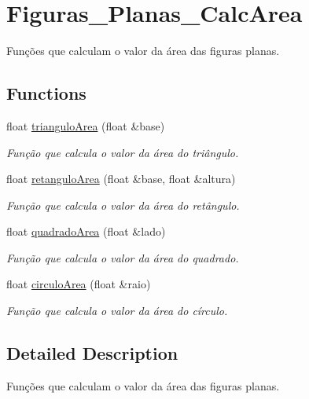 \hypertarget{group__Figuras__Planas__CalcArea}{}\section{Figuras\+\_\+\+Planas\+\_\+\+Calc\+Area}
\label{group__Figuras__Planas__CalcArea}


Funções que calculam o valor da área das figuras planas.  


\subsection*{Functions}
\begin{DoxyCompactItemize}
\item 
float \hyperlink{group__Figuras__Planas__CalcArea_gad3dd4559c961d21265a1fe46e7d5c3cc}{triangulo\+Area} (float \&base)
\begin{DoxyCompactList}\small\item\em Função que calcula o valor da área do triângulo. \end{DoxyCompactList}\item 
float \hyperlink{group__Figuras__Planas__CalcArea_gaadec7ea7b857fb93862af9da30f4b896}{retangulo\+Area} (float \&base, float \&altura)
\begin{DoxyCompactList}\small\item\em Função que calcula o valor da área do retângulo. \end{DoxyCompactList}\item 
float \hyperlink{group__Figuras__Planas__CalcArea_gac85a6a6234680349b5b8329d4333567e}{quadrado\+Area} (float \&lado)
\begin{DoxyCompactList}\small\item\em Função que calcula o valor da área do quadrado. \end{DoxyCompactList}\item 
float \hyperlink{group__Figuras__Planas__CalcArea_gac50529a5e8458336df0f0e2329e49833}{circulo\+Area} (float \&raio)
\begin{DoxyCompactList}\small\item\em Função que calcula o valor da área do círculo. \end{DoxyCompactList}\end{DoxyCompactItemize}


\subsection{Detailed Description}
Funções que calculam o valor da área das figuras planas. 



